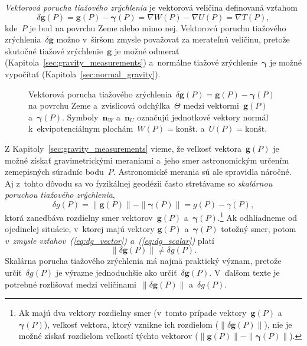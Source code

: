 \documentclass[a4paper, 12pt]{book}
\let\vec\mathbf
\begin{document}
\emph{Vektorová porucha tiažového zrýchlenia} je vektorová veličina definovaná 
vzťahom
%
\begin{equation}
\label{eq:dg_vector}
\delta \vec g(P) = \vec g(P) - \boldsymbol \gamma(P) = \nabla W(P) - \nabla 
U(P) = \nabla T(P){,}
\end{equation}
%
kde~$P$ je bod na povrchu Zeme alebo mimo nej.  Vektorovú poruchu tiažového 
zrýchlenia~$\delta \vec g$ možno v~širšom zmysle považovať za merateľnú 
veličinu, pretože skutočné tiažové zrýchlenie~$\vec g$ je možné odmerať 
(Kapitola~\ref{sec:gravity_measurements}) a~normálne tiažové 
zrýchlenie~$\boldsymbol\gamma$ je možné vypočítať 
(Kapitola~\ref{sec:normal_gravity}).

\begin{figure}[bt]
\centering

\caption{Vektorová porucha tiažového zrýchlenia~$\delta \vec g(P) = \vec g(P) 
- \boldsymbol\gamma(P)$ na povrchu Zeme a~zvislicová odchýlka~$\Theta$ medzi 
vektormi~$\vec g(P)$ a~$\boldsymbol\gamma(P)$.  Symboly~$\vec n_W$ a~$\vec n_U$ 
označujú jednotkové vektory normál k~ekvipotenciálnym plochám~$W(P) 
= \textrm{kon\v{s}t.}$ a~$U(P) = \textrm{kon\v{s}t.}$}
\label{fig:gravity_disturbance}
\end{figure}

Z Kapitoly~\ref{sec:gravity_measurements} vieme, že veľkosť vektora~$\vec g(P)$ 
je možné získať gravimetrickými meraniami a~jeho smer astronomickým určením 
zemepisných súradníc bodu~$P$.  Astronomické merania sú ale spravidla náročné.  
Aj z~tohto dôvodu sa vo fyzikálnej geodézii často stretávame so \emph{skalárnou 
poruchou tiažového zrýchlenia},
%
\begin{equation}
\label{eq:dg_scalar}
\delta g(P) = \| \vec g(P) \| - \| \boldsymbol \gamma(P) \| = g(P) 
- \gamma(P){,}
\end{equation}
%
ktorá zanedbáva rozdielny smer vektorov~$\vec g(P)$ a~$\boldsymbol 
\gamma(P)$.\footnote{Ak majú dva vektory rozdielny smer (v~tomto prípade 
vektory~$\vec g(P)$ a~$\boldsymbol \gamma(P)$), veľkosť vektora, ktorý vznikne 
ich rozdielom ($\| \delta \vec g(P) \|$), nie je možné získať rozdielom 
veľkostí týchto vektorov ($\| \vec g(P) \| - \| \boldsymbol \gamma(P) \|$).}  
Ak odhliadneme od ojedinelej situácie, v~ktorej majú vektory $\vec g(P)$ 
a~$\boldsymbol{\gamma}(P)$ totožný smer, potom \emph{v~zmysle 
vzťahov~(\ref{eq:dg_vector}) a~(\ref{eq:dg_scalar})} platí
%
\begin{equation}
\| \delta \vec g(P) \| \neq \delta g(P){.}
\end{equation}
%
Skalárna porucha tiažového zrýchlenia má najmä praktický význam, pretože 
určiť~$\delta g(P)$ je výrazne jednoduchšie ako určiť~$\delta \vec g(P)$.  
V~ďalšom texte je potrebné rozlišovať medzi veličinami~$\| \delta \vec g(P) \|$ 
a~$\delta g(P)$.
\end{document}
